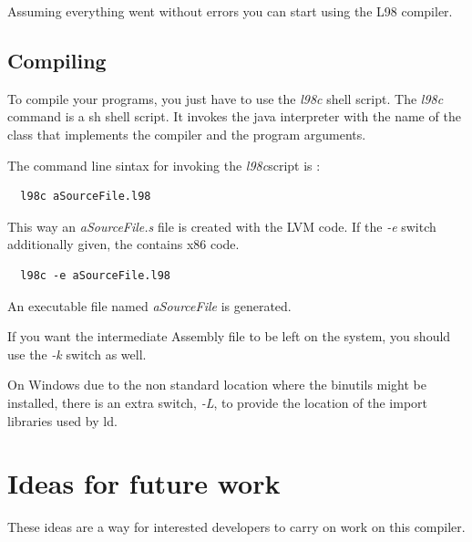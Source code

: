 \documentclass[a4paper, 11pt]{report}
\newcommand{\switch}[1]{\textsl{#1}}
\begin{document}
  Assuming everything went without errors you can start using the L98 compiler.

\section{Compiling}
  To compile your programs, you just have to use the \emph{l98c} shell script.
The \emph{l98c} command is a sh shell script. It invokes the java interpreter
with the name of the class that implements the compiler and the program arguments.

The command line sintax for invoking the \emph{l98c}script is :

\begin{verbatim}
  l98c aSourceFile.l98
\end{verbatim}

This way an \emph{aSourceFile.s} file is created with the LVM code. If the
\switch{-e} switch additionally given, the contains x86 code.

\begin{verbatim}
  l98c -e aSourceFile.l98
\end{verbatim}

An executable file named \emph{aSourceFile} is generated.

If you want the intermediate Assembly file to be left on the system, you should
use the \switch{-k} switch as well.

On Windows due to the non standard location where the binutils might be installed, there is
an extra switch, \switch{-L}, to provide the location of the import libraries used by ld.

\chapter{Ideas for future work}
\label{sct:ideas}

These ideas are a way for interested developers to carry on work on this compiler.
\end{document}
